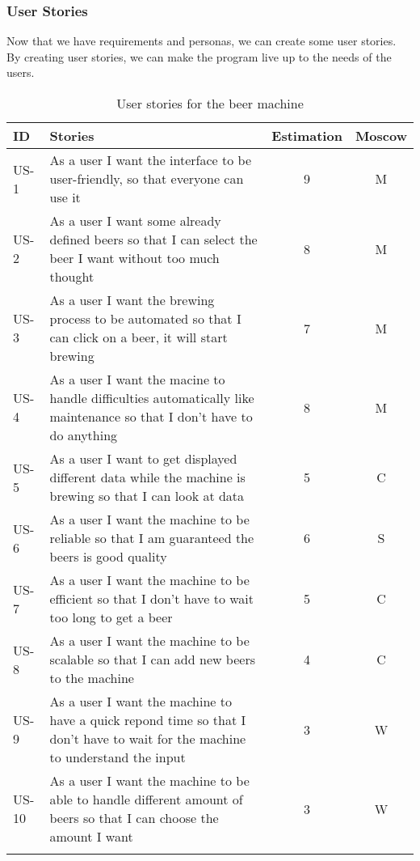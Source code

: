 \subsubsection{User Stories}

Now that we have requirements and personas, we can create some user stories. By creating user stories, we can make the program live up to the needs of the users.

\begin{table}[H]
    \begin{center}
        \sloppy
        \begin{longtable}{|p{1cm}|p{11cm}|c|c|}
            \hline
            ID    & Stories                                                                                                                       & Estimation & Moscow \\ \hline
            US-1  & As a user I want the interface to be user-friendly, so that everyone can use it                                               & 9          & M      \\ \hline
            US-2  & As a user I want some already defined beers  so that I can select the beer I want without too much thought                    & 8          & M      \\ \hline
            US-3  & As a user I want the brewing process to be automated so that I can click on a beer, it will start brewing                     & 7          & M      \\ \hline
            US-4  & As a user I want the macine to handle difficulties automatically like maintenance so that I don't have to do anything         & 8          & M      \\ \hline
            US-5  & As a user I want to get displayed different data while the machine is brewing so that I can look at data                      & 5          & C      \\ \hline
            US-6  & As a user I want the machine to be reliable so that I am guaranteed the beers is good quality                                 & 6          & S      \\ \hline
            US-7  & As a user I want the machine to be efficient so that I don't have to wait too long to get a beer                              & 5          & C      \\ \hline
            US-8  & As a user I want the machine to be scalable so that I can add new beers to the machine                                        & 4          & C      \\ \hline
            US-9  & As a user I want the machine to have a quick repond time so that I don't have to wait for the machine to understand the input & 3          & W      \\ \hline
            US-10 & As a user I want the machine to be able to handle different amount of beers so that I can choose the amount I want            & 3          & W      \\ \hline

            \caption{User stories for the beer machine}
            \label{tab:user_stories}
        \end{longtable}
    \end{center}
\end{table}
